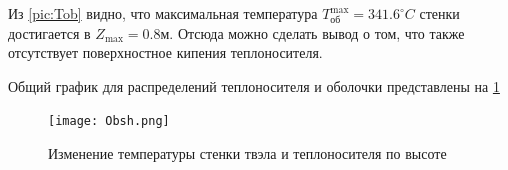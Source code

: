  Из \ref{pic:Tob} 
 видно, что максимальная температура $T_{\text{об}}^{\max} = 341.6 ^\circ C $ стенки достигается в $Z_{\max} = 0.8 м$. Отсюда можно сделать вывод о том, что также отсутствует поверхностное кипения теплоносителя.

Общий график для распределений теплоносителя и оболочки представлены на \ref{pic:obsh}

\begin{figure}[H]
	\begin{center}
		\texttt{[image: Obsh.png]}
		\caption{Изменение температуры стенки твэла и теплоносителя по высоте}
		\label{pic:obsh} %
	\end{center}
\end{figure}
    

